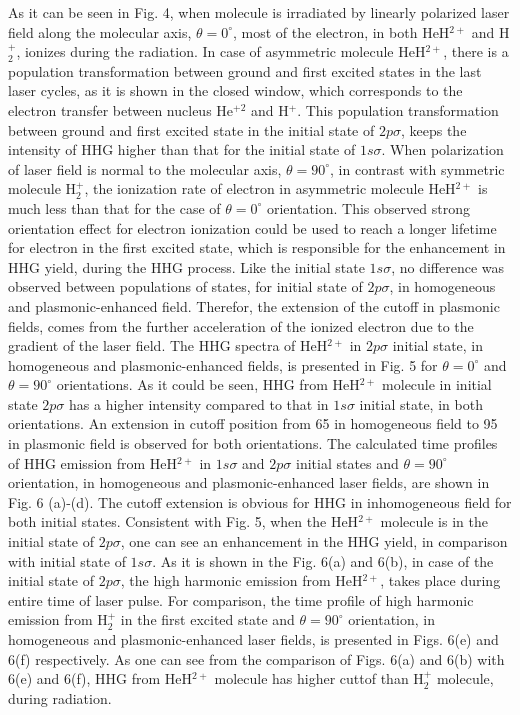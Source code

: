 \documentclass[%
reprint,
twocolumn,
 amsmath,amssymb,
 aps,
pra,
 showpacs
]{revtex4-1}
\begin{document}
As it can be seen in Fig. 4, when  molecule is irradiated by linearly polarized laser field along the molecular axis, $\theta=0^{\circ}$, most of the electron, in both HeH$^{2+}$ and H$_2^{+}$, ionizes during the radiation. In case of asymmetric molecule HeH$^{2+}$, there is a population transformation between ground and first excited states in the last laser cycles, as it is shown in the closed window, which corresponds to the electron transfer between nucleus He$^{+2}$ and H$^+$. This population transformation between ground and first excited state in the initial state of $2p\sigma$, keeps the intensity of HHG higher than that for the initial state of $1s\sigma$. When polarization of laser field is normal to the molecular axis, $\theta=90^{\circ}$, in contrast with symmetric molecule H$_2^{+}$, the ionization rate of electron in asymmetric molecule HeH$^{2+}$ is much less than that for the case of $\theta=0^{\circ}$ orientation. This observed strong orientation effect for electron ionization could be used to reach a longer lifetime for electron in the first excited state, which is responsible for the enhancement in HHG yield, during the HHG process. Like the initial state $1s\sigma$, no difference was observed between populations of states, for initial state of $2p\sigma$, in homogeneous and plasmonic-enhanced field. Therefor, the extension of the cutoff in plasmonic fields, comes from the further acceleration of the ionized electron due to the gradient of the laser field. 
The HHG spectra of HeH$^{2+}$ in $2p\sigma$ initial state, in homogeneous and plasmonic-enhanced fields, is presented in Fig. 5 for $\theta=0^{\circ}$ and $\theta=90^{\circ}$ orientations. As it could be seen, HHG from HeH$^{2+}$ molecule in initial state $2p\sigma$ has a higher intensity compared to that in $1s\sigma$ initial state, in both orientations. An extension in cutoff position from 65 in homogeneous field to 95 in plasmonic field is observed for both orientations.
The calculated time profiles of HHG emission from HeH$^{2+}$ in $1s\sigma$ and $2p\sigma$ initial states and $\theta=90^{\circ}$ orientation, in homogeneous and plasmonic-enhanced laser fields, are shown in Fig. 6 (a)-(d). The cutoff extension is obvious for HHG in inhomogeneous field for both initial states. Consistent with Fig. 5, when the HeH$^{2+}$ molecule is in the initial state of $2p\sigma$, one can see an enhancement in the HHG yield, in comparison with initial state of $1s\sigma$. As it is shown in the Fig. 6(a) and 6(b), in case of the initial state of $2p\sigma$, the high harmonic emission from HeH$^{2+}$, takes place during entire time of laser pulse. For comparison, the time profile of high harmonic emission from H$_2^{+}$ in the first excited state and $\theta=90^{\circ}$ orientation, in homogeneous and plasmonic-enhanced laser fields, is presented in Figs. 6(e) and 6(f) respectively. As one can see from the comparison of Figs. 6(a) and 6(b) with 6(e) and 6(f), HHG from HeH$^{2+}$ molecule has higher cuttof than H$_2^{+}$ molecule, during radiation.\\
\end{document}

